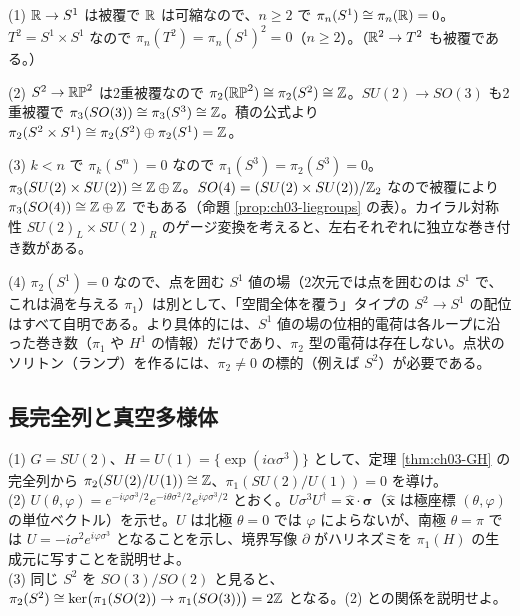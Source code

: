 \begin{solution}
(1) $\mathbb{R}\to S^1$ は被覆で $\mathbb{R}$ は可縮なので、$n\ge2$ で $\pi_n(S^1)\cong\pi_n(\mathbb{R})=0$。$T^2=S^1\times S^1$ なので $\pi_n(T^2)=\pi_n(S^1)^2=0$（$n\ge2$）。（$\mathbb{R}^2\to T^2$ も被覆である。）

(2) $S^2\to\mathbb{RP}^2$ は2重被覆なので $\pi_2(\mathbb{RP}^2)\cong\pi_2(S^2)\cong\mathbb{Z}$。$SU(2)\to SO(3)$ も2重被覆で $\pi_3(SO(3))\cong\pi_3(S^3)\cong\mathbb{Z}$。積の公式より $\pi_2(S^2\times S^1)\cong\pi_2(S^2)\oplus\pi_2(S^1)=\mathbb{Z}$。

(3) $k<n$ で $\pi_k(S^n)=0$ なので $\pi_1(S^3)=\pi_2(S^3)=0$。$\pi_3(SU(2)\times SU(2))\cong\mathbb{Z}\oplus\mathbb{Z}$。$SO(4)=(SU(2)\times SU(2))/\mathbb{Z}_2$ なので被覆により $\pi_3(SO(4))\cong\mathbb{Z}\oplus\mathbb{Z}$ でもある（命題 \ref{prop:ch03-liegroups} の表）。カイラル対称性 $SU(2)_L\times SU(2)_R$ のゲージ変換を考えると、左右それぞれに独立な巻き付き数がある。

(4) $\pi_2(S^1)=0$ なので、点を囲む $S^1$ 値の場（2次元では点を囲むのは $S^1$ で、これは渦を与える $\pi_1$）は別として、「空間全体を覆う」タイプの $S^2\to S^1$ の配位はすべて自明である。より具体的には、$S^1$ 値の場の位相的電荷は各ループに沿った巻き数（$\pi_1$ や $H^1$ の情報）だけであり、$\pi_2$ 型の電荷は存在しない。点状のソリトン（ランプ）を作るには、$\pi_2\neq0$ の標的（例えば $S^2$）が必要である。
\end{solution}

\subsection{長完全列と真空多様体}

\begin{problem}[難易度 B]\label{ch03-prob-su2u1}
(1) $G=SU(2)$、$H=U(1)=\{\exp(i\alpha\sigma^3)\}$ として、定理 \ref{thm:ch03-GH} の完全列から $\pi_2(SU(2)/U(1))\cong\mathbb{Z}$、$\pi_1(SU(2)/U(1))=0$ を導け。\\
(2) $U(\theta,\varphi)=e^{-i\varphi\sigma^3/2}e^{-i\theta\sigma^2/2}e^{i\varphi\sigma^3/2}$ とおく。$U\sigma^3U^\dagger=\hat{\bm x}\cdot\bm\sigma$（$\hat{\bm x}$ は極座標 $(\theta,\varphi)$ の単位ベクトル）を示せ。$U$ は北極 $\theta=0$ では $\varphi$ によらないが、南極 $\theta=\pi$ では $U=-i\sigma^2e^{i\varphi\sigma^3}$ となることを示し、境界写像 $\partial$ がハリネズミを $\pi_1(H)$ の生成元に写すことを説明せよ。\\
(3) 同じ $S^2$ を $SO(3)/SO(2)$ と見ると、$\pi_2(S^2)\cong\ker\bigl(\pi_1(SO(2))\to\pi_1(SO(3))\bigr)=2\mathbb{Z}$ となる。(2) との関係を説明せよ。
\end{problem}

